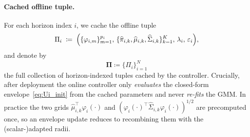 \documentclass[lettersize,journal]{IEEEtran}
\begin{document}
\paragraph{Cached offline tuple.}
For each horizon index $i$, we cache the offline tuple
\begin{equation}
\Pi_i
\;\coloneqq\;
\Bigl(
\{\varphi_{i,m}\}_{m=1}^{p_i},\,
\{\widehat\pi_{i,k},\widehat\mu_{i,k},\widehat\Sigma_{i,k}\}_{k=1}^K,\,
\lambda_i,\,
\varepsilon_i
\Bigr),
\label{eq:Pi_i_tuple}
\end{equation}
and denote by
\begin{equation}
\boldsymbol{\Pi}\coloneqq\{\Pi_i\}_{i=1}^N
\label{eq:Pi_collection}
\end{equation}
the full collection of horizon-indexed tuples cached by the controller.
Crucially, after deployment the online controller only \emph{evaluates} the closed-form envelope~\eqref{eq:Ui_init} from the cached parameters and never \emph{re-fits} the GMM. In practice the two grids $\widehat\mu_{i,k}^\top\varphi_i(\cdot)$ and $(\varphi_i(\cdot)^\top\widehat\Sigma_{i,k}\varphi_i(\cdot))^{1/2}$ are precomputed once, so an envelope update reduces to recombining them with the (scalar-)adapted radii.
\end{document}
